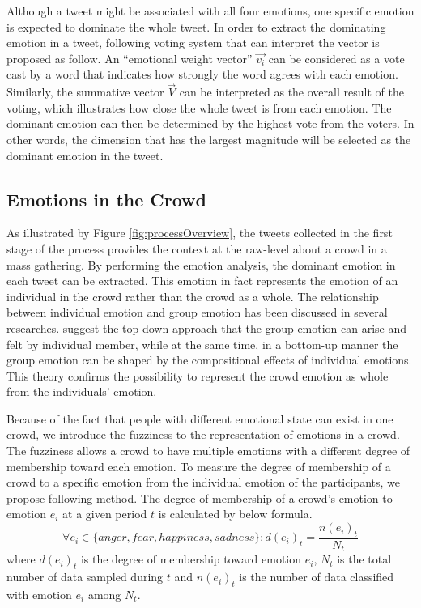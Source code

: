 Although a tweet might be associated with all four emotions, one specific emotion is expected to dominate the whole tweet. In order to extract the dominating emotion in a tweet, following voting system that can interpret the vector is proposed as follow. An ``emotional weight vector'' \(\vec{v_i}\) can be considered as a vote cast by a word that indicates how strongly the word agrees with each emotion. Similarly, the summative vector \(\vec{V}\) can be interpreted as the overall result of the voting, which illustrates how close the whole tweet is from each emotion. The dominant emotion can then be determined by the highest vote from the voters. In other words, the dimension that has the largest magnitude will be selected as the dominant emotion in the tweet.

\subsection{Emotions in the Crowd}
As illustrated by Figure \ref{fig:processOverview}, the tweets collected in the first stage of the process provides the context at the raw-level about a crowd in a mass gathering. By performing the emotion analysis, the dominant emotion in each tweet can be extracted. This emotion in fact represents the emotion of an individual in the crowd rather than the crowd as a whole. The relationship between individual emotion and group emotion has been discussed in several researches. \citet{barsade1998group} suggest the top-down approach that the group emotion can arise and felt by individual member, while at the same time, in a bottom-up manner the group emotion can be shaped by the compositional effects of individual emotions. This theory confirms the possibility to represent the crowd emotion as whole from the individuals' emotion.

Because of the fact that people with different emotional state can exist in one crowd, we introduce the fuzziness to the representation of emotions in a crowd. The fuzziness allows a crowd to have multiple emotions with a different degree of membership toward each emotion. To measure the degree of membership of a crowd to a specific emotion from the individual emotion of the participants, we propose following method. The degree of membership of a crowd's emotion to emotion \(e_i\) at a given period \(t\) is calculated by below formula.
\[
	\forall e_i \in \{anger, fear, happiness, sadness\}: d(e_i)_t = \frac{n(e_i)_t}{N_t}
\]
where \(d(e_i)_t\) is the degree of membership toward emotion \(e_i\), \(N_t\) is the total number of data sampled during \(t\) and \(n(e_i)_t\) is the number of data classified with emotion \(e_i\) among \(N_t\).

